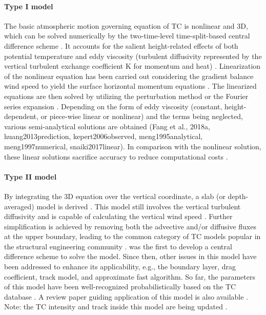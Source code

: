 \paragraph{Type I model} The basic atmospheric motion governing equation of TC is nonlinear and 3D, which can be solved numerically by the two-time-level time-split-based central difference scheme \citep{kepert2001dynamics-ii,kepert2011choosing}. It accounts for the salient height-related effects of both potential temperature and eddy viscosity (turbulent diffusivity represented by the vertical turbulent exchange coefficient K for momentum and heat) \citep{kepert2001dynamics-ii, kepert2010slab-ii}. Linearization of the nonlinear equation has been carried out considering the gradient balance wind speed to yield the surface horizontal momentum equations \citep{kepert2001dynamics-i}. The linearized equations are then solved by utilizing the perturbation method \citep{meng1995analytical} or the Fourier series expansion \citep{kepert2001dynamics-i}. Depending on the form of eddy viscosity (constant, height-dependent, or piece-wise linear or nonlinear) and the terms being neglected, various semi-analytical solutions are obtained (Fang et al., 2018a, huang2013prediction, kepert2006observed, meng1995analytical, meng1997numerical, snaiki2017linear). In comparison with the nonlinear solution, these linear solutions sacrifice accuracy to reduce computational costs \citep{kepert2014reply}. 

\paragraph{Type II model} By integrating the 3D equation over the vertical coordinate, a slab (or depth-averaged) model is derived \citep{kepert2010slab-i}. This model still involves the vertical turbulent diffusivity and is capable of calculating the vertical wind speed \citep{langousis2008extreme, smith1968surface, smith2008simple}. Further simplification is achieved by removing both the advective and/or diffusive fluxes at the upper boundary, leading to the common category of TC models popular in the structural engineering community \citep{powell2005state, shapiro1983asymmetric, vickery2000hurricane, vickery2009hurricane-b}. \cite{chow1971study} was the first to develop a central difference scheme to solve the model. Since then, other issues in this model have been addressed to enhance its applicability, e.g., the boundary layer, drag coefficient, track model, and approximate fast algorithm. So far, the parameters of this model have been well-recognized probabilistically based on the TC database \citep{vickery2008statistical}. A review paper guiding application of this model is also available \citep{vickery2009hurricane-a}. Note: the TC intensity and track inside this model are being updated \citep{mudd2015development, vickery2010synthetic}. 

